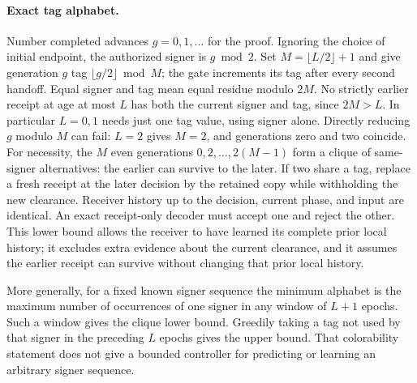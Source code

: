 \documentclass[11pt]{article}
\begin{document}
\paragraph{Exact tag alphabet.}
Number completed advances \(g=0,1,\ldots\) for the proof. Ignoring the
choice of initial endpoint, the authorized signer is \(g\bmod 2\).
Set \(M=\lfloor L/2\rfloor+1\) and give generation \(g\) tag
\(\lfloor g/2\rfloor\bmod M\); the gate increments its tag after every
second handoff. Equal signer and tag mean equal residue modulo \(2M\).
No strictly earlier receipt at age at most \(L\) has both the current
signer and tag, since \(2M>L\). In particular \(L=0,1\) needs just one
tag value, using signer alone. Directly reducing \(g\) modulo \(M\) can
fail: \(L=2\) gives \(M=2\), and generations zero and two coincide.
For necessity, the \(M\) even generations \(0,2,\ldots,2(M-1)\) form a clique
of same-signer alternatives: the earlier can survive to the later. If two
share a tag, replace a fresh receipt at the later decision by the retained
copy while withholding the new clearance. Receiver history up to the
decision, current phase, and input are identical. An exact receipt-only
decoder must accept one and reject the other. This lower bound allows the
receiver to have learned its complete prior local history; it excludes
extra evidence about the current clearance, and it assumes the earlier
receipt can survive without changing that prior local history.

More generally, for a fixed known signer sequence the minimum alphabet is
the maximum number of occurrences of one signer in any window of \(L+1\)
epochs. Such a window gives the clique lower bound. Greedily taking a tag
not used by that signer in the preceding \(L\) epochs gives the upper
bound. That colorability statement does not give a bounded controller for
predicting or learning an arbitrary signer sequence.
\end{document}
